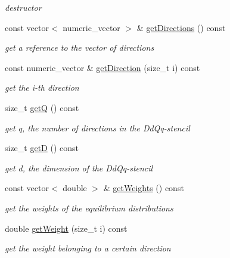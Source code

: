 \begin{DoxyCompactItemize}
\begin{DoxyCompactList}\small\item\em destructor \item\end{DoxyCompactList}\item 
const vector$<$ numeric\_\-vector $>$ \& \hyperlink{classnatrium_1_1Stencil_a02dbfdb70b94a32f477a6ac57ed14f5e}{getDirections} () const 
\begin{DoxyCompactList}\small\item\em get a reference to the vector of directions \item\end{DoxyCompactList}\item 
const numeric\_\-vector \& \hyperlink{classnatrium_1_1Stencil_a76b179032543b3436dea199beceab000}{getDirection} (size\_\-t i) const 
\begin{DoxyCompactList}\small\item\em get the i-\/th direction \item\end{DoxyCompactList}\item 
size\_\-t \hyperlink{classnatrium_1_1Stencil_a9c42c1e1fbc5308a8ba1281eb5e4be18}{getQ} () const 
\begin{DoxyCompactList}\small\item\em get q, the number of directions in the DdQq-\/stencil \item\end{DoxyCompactList}\item 
size\_\-t \hyperlink{classnatrium_1_1Stencil_a55ee00e8c03b266c7eeed3964d2c93bf}{getD} () const 
\begin{DoxyCompactList}\small\item\em get d, the dimension of the DdQq-\/stencil \item\end{DoxyCompactList}\item 
const vector$<$ double $>$ \& \hyperlink{classnatrium_1_1Stencil_a35c26427afdd33c3477b60be157e5bc8}{getWeights} () const 
\begin{DoxyCompactList}\small\item\em get the weights of the equilibrium distributions \item\end{DoxyCompactList}\item 
double \hyperlink{classnatrium_1_1Stencil_ae5cb8bd1a305ed29c779725f489bb855}{getWeight} (size\_\-t i) const 
\begin{DoxyCompactList}\small\item\em get the weight belonging to a certain direction \item\end{DoxyCompactList}\item 

\end{DoxyCompactItemize}
